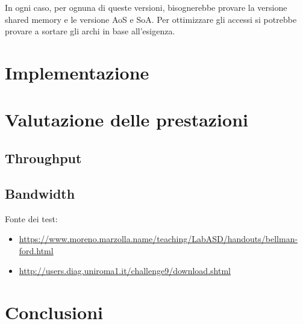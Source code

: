 \documentclass{article}
\begin{document}
	In ogni caso, per ognuna di queste versioni, bisognerebbe provare la versione shared memory e le versione AoS e SoA. Per ottimizzare gli accessi si potrebbe provare a sortare gli archi in base all'esigenza.
	
	\section{Implementazione}
	\label{section:impl}
	
	\section{Valutazione delle prestazioni}
	\label{section:perf}
	\subsection{Throughput}
	\subsection{Bandwidth}
	Fonte dei test:
	\begin{itemize}
		\item \url{https://www.moreno.marzolla.name/teaching/LabASD/handouts/bellman-ford.html}
		\item \url{http://users.diag.uniroma1.it/challenge9/download.shtml}
	\end{itemize}
	
	\section{Conclusioni}
	\label{section:end}
	
	\printbibliography
	
\end{document}
